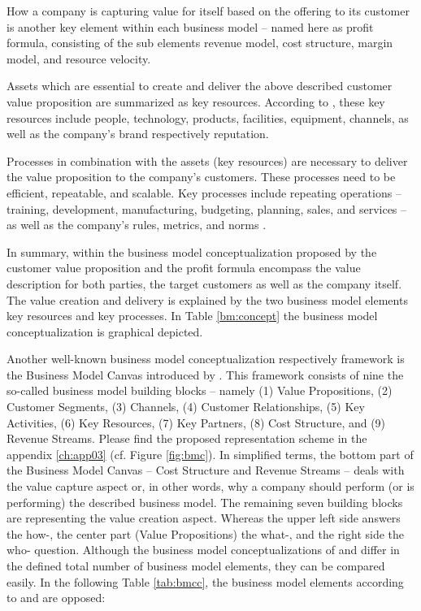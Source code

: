How a company is capturing value for itself based on the offering to its customer is another key element within each business model -- named here as profit formula, consisting of the sub elements revenue model, cost structure, margin model, and resource velocity.

Assets which are essential to create and deliver the above described customer value proposition are summarized as key resources. According to \citet[p. 53]{Johnson2008}, these key resources include people, technology, products, facilities, equipment, channels, as well as the company's brand respectively reputation.

Processes in combination with the assets (key resources) are necessary to deliver the value proposition to the company's customers. These processes need to be efficient, repeatable, and scalable. Key processes include repeating operations -- training, development, manufacturing, budgeting, planning, sales, and services -- as well as the company's rules, metrics, and norms \citep[p. 53]{Johnson2008}.

In summary, within the business model conceptualization proposed by \citet[p. 54]{Johnson2008} the customer value proposition and the profit formula encompass the value description for both parties, the target customers as well as the company itself. The value creation and delivery is explained by the two business model elements key resources and key processes. In Table \ref{bm:concept} the business model conceptualization is graphical depicted.



Another well-known business model conceptualization respectively framework is the Business Model Canvas introduced by \citet{Osterwalder2010}. This framework consists of nine the so-called business model building blocks -- namely (1) Value Propositions, (2) Customer Segments, (3) Channels, (4) Customer Relationships, (5) Key Activities, (6) Key Resources, (7) Key Partners, (8) Cost Structure, and (9) Revenue Streams. Please find the proposed representation scheme in the appendix \ref{ch:app03} (cf. Figure \ref{fig:bmc}). In simplified terms, the bottom part of the Business Model Canvas -- Cost Structure and Revenue Streams -- deals with the value capture aspect or, in other words, why a company should perform (or is performing) the described business model. The remaining seven building blocks are representing the value creation aspect. Whereas the upper left side answers the how-, the center part (Value Propositions) the what-, and the right side the who- question. Although the business model conceptualizations of \citet{Johnson2008} and \citet{Osterwalder2010} differ in the defined total number of business model elements, they can be compared easily. In the following Table \ref{tab:bmcc}, the business model elements according to \citet{Johnson2008} and \citet{Osterwalder2010} are opposed:

